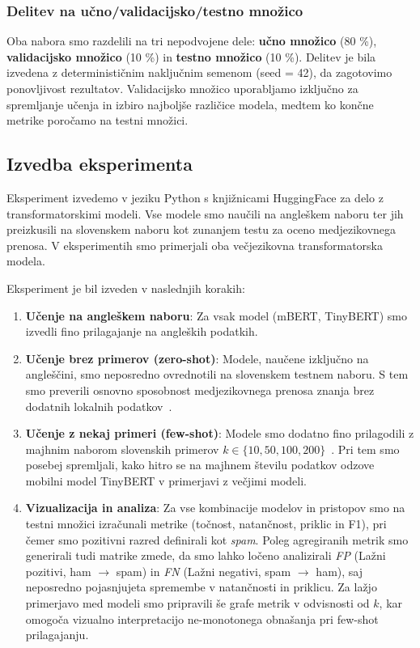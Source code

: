 \documentclass[sigconf,nonacm]{acmart}
\begin{document}
\subsubsection{Delitev na učno/validacijsko/testno množico}
Oba nabora smo razdelili na tri nepodvojene dele: \textbf{učno množico} (80 \%), \textbf{validacijsko množico} (10 \%) in \textbf{testno množico} (10 \%).
Delitev je bila izvedena z determinističnim naključnim semenom (seed = 42), da zagotovimo ponovljivost rezultatov.
Validacijsko množico uporabljamo izključno za spremljanje učenja in izbiro najboljše različice modela, medtem ko končne metrike poročamo na testni množici.

\subsection{Izvedba eksperimenta}
    Eksperiment izvedemo v jeziku Python s knjižnicami HuggingFace za delo z transformatorskimi modeli.
    Vse modele smo naučili na angleškem naboru ter jih preizkusili na slovenskem naboru kot zunanjem testu za oceno medjezikovnega prenosa.
    V eksperimentih smo primerjali oba večjezikovna transformatorska modela.

    Eksperiment je bil izveden v naslednjih korakih:

\begin{enumerate}
    \item \textbf{Učenje na angleškem naboru}: Za vsak model (mBERT, TinyBERT) smo izvedli fino prilagajanje na angleških podatkih.
    \item \textbf{Učenje brez primerov (zero-shot)}: Modele, naučene izključno na angleščini, smo neposredno ovrednotili na slovenskem testnem naboru. S tem smo preverili osnovno sposobnost medjezikovnega prenosa znanja brez dodatnih lokalnih podatkov~\cite{pires2019}.
    \item \textbf{Učenje z nekaj primeri (few-shot)}: Modele smo dodatno fino prilagodili z majhnim naborom slovenskih primerov $k \in \{10, 50, 100, 200\}$~\cite{zhao2021closer}. Pri tem smo posebej spremljali, kako hitro se na majhnem številu podatkov odzove mobilni model TinyBERT v primerjavi z večjimi modeli.
    \item \textbf{Vizualizacija in analiza}: Za vse kombinacije modelov in pristopov smo na testni množici izračunali metrike (točnost, natančnost, priklic in F1), pri čemer smo pozitivni razred definirali kot \emph{spam}. Poleg agregiranih metrik smo generirali tudi matrike zmede, da smo lahko ločeno analizirali \textit{FP} (Lažni pozitivi, ham $\rightarrow$ spam) in \textit{FN} (Lažni negativi, spam $\rightarrow$ ham), saj neposredno pojasnjujeta spremembe v natančnosti in priklicu. Za lažjo primerjavo med modeli smo pripravili še grafe metrik v odvisnosti od $k$, kar omogoča vizualno interpretacijo ne-monotonega obnašanja pri few-shot prilagajanju.
\end{enumerate}
\end{document}
